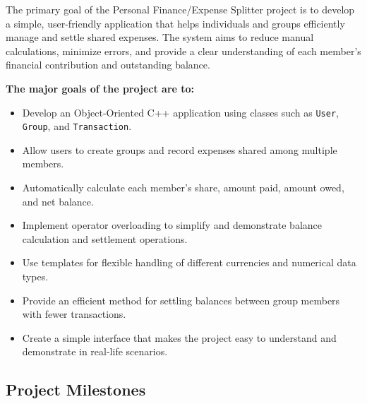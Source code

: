 \documentclass[11pt,a4paper]{article}
\begin{document}
The primary goal of the Personal Finance/Expense Splitter project is to develop a simple, user-friendly application that helps individuals and groups efficiently manage and settle shared expenses. The system aims to reduce manual calculations, minimize errors, and provide a clear understanding of each member's financial contribution and outstanding balance.

\medskip
\noindent\textbf{The major goals of the project are to:}
\begin{itemize}[leftmargin=1.5em]
  \item Develop an Object-Oriented C++ application using classes such as \texttt{User}, \texttt{Group}, and \texttt{Transaction}.
  \item Allow users to create groups and record expenses shared among multiple members.
  \item Automatically calculate each member's share, amount paid, amount owed, and net balance.
  \item Implement operator overloading to simplify and demonstrate balance calculation and settlement operations.
  \item Use templates for flexible handling of different currencies and numerical data types.
  \item Provide an efficient method for settling balances between group members with fewer transactions.
  \item Create a simple interface that makes the project easy to understand and demonstrate in real-life scenarios.
\end{itemize}

\subsection*{Project Milestones}
\end{document}

